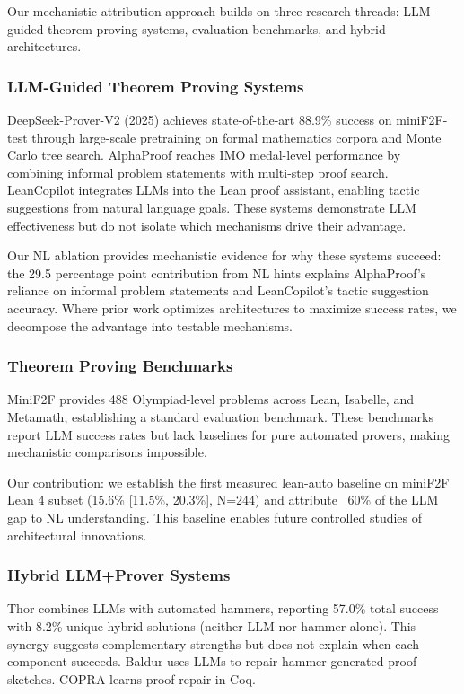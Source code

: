 
Our mechanistic attribution approach builds on three research threads: LLM-guided theorem proving systems, evaluation benchmarks, and hybrid architectures.

\subsubsection{LLM-Guided Theorem Proving Systems}

DeepSeek-Prover-V2 (2025) achieves state-of-the-art 88.9\% success on miniF2F-test through large-scale pretraining on formal mathematics corpora and Monte Carlo tree search. AlphaProof \citep{DeepMind2024} reaches IMO medal-level performance by combining informal problem statements with multi-step proof search. LeanCopilot integrates LLMs into the Lean proof assistant, enabling tactic suggestions from natural language goals. These systems demonstrate LLM effectiveness but do not isolate which mechanisms drive their advantage.

Our NL ablation provides mechanistic evidence for why these systems succeed: the 29.5 percentage point contribution from NL hints explains AlphaProof's reliance on informal problem statements and LeanCopilot's tactic suggestion accuracy. Where prior work optimizes architectures to maximize success rates, we decompose the advantage into testable mechanisms.

\subsubsection{Theorem Proving Benchmarks}

MiniF2F \citep{MiniF2F_2021} provides 488 Olympiad-level problems across Lean, Isabelle, and Metamath, establishing a standard evaluation benchmark. These benchmarks report LLM success rates but lack baselines for pure automated provers, making mechanistic comparisons impossible.

Our contribution: we establish the first measured lean-auto baseline on miniF2F Lean 4 subset (15.6\% [11.5\%, 20.3\%], N=244) and attribute ~60\% of the LLM gap to NL understanding. This baseline enables future controlled studies of architectural innovations.

\subsubsection{Hybrid LLM+Prover Systems}

Thor \citep{Thor_2022} combines LLMs with automated hammers, reporting 57.0\% total success with 8.2\% unique hybrid solutions (neither LLM nor hammer alone). This synergy suggests complementary strengths but does not explain when each component succeeds. Baldur \citep{Baldur_2023} uses LLMs to repair hammer-generated proof sketches. COPRA \citep{COPRA_2023} learns proof repair in Coq.

